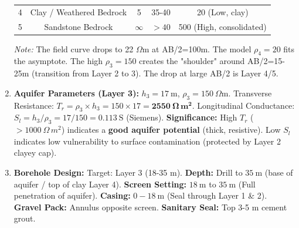 \documentclass[11pt]{article}
\begin{document}
\begin{exoresolu}
\begin{enumerate}
\begin{center}
\begin{tabular}{|c|c|c|c|c|}
    4 & Clay / Weathered Bedrock & 5 & 35-40 & 20 (Low, clay) \\
    5 & Sandstone Bedrock & $\infty$ & $>40$ & 500 (High, consolidated) \\
    \hline
    \end{tabular}
    \end{center}
    \textit{Note:} The field curve drops to 22 $\Omega$m at AB/2=100m. The model $\rho_4=20$ fits the asymptote. The high $\rho_3=150$ creates the "shoulder" around AB/2=15-25m (transition from Layer 2 to 3). The drop at large AB/2 is Layer 4/5.
    \item \textbf{Aquifer Parameters (Layer 3):}
    $h_3 = 17\ \mathrm{m}$, $\rho_3 = 150\ \Omega$m.
    Transverse Resistance: $T_r = \rho_3 \times h_3 = 150 \times 17 = \mathbf{2550\ \Omega\,m^2}$.
    Longitudinal Conductance: $S_l = h_3 / \rho_3 = 17 / 150 = \mathbf{0.113\ \mathrm{S}}$ (Siemens).
    \textbf{Significance:} High $T_r$ ($> 1000\ \Omega\,m^2$) indicates a \textbf{good aquifer potential} (thick, resistive). Low $S_l$ indicates low vulnerability to surface contamination (protected by Layer 2 clayey cap).
    \item \textbf{Borehole Design:}
    Target: Layer 3 (18-35 m).
    \textbf{Depth:} Drill to $35\ \mathrm{m}$ (base of aquifer / top of clay Layer 4).
    \textbf{Screen Setting:} $18\ \mathrm{m}$ to $35\ \mathrm{m}$ (Full penetration of aquifer).
    \textbf{Casing:} $0-18\ \mathrm{m}$ (Seal through Layer 1 \& 2).
    \textbf{Gravel Pack:} Annulus opposite screen.
    \textbf{Sanitary Seal:} Top 3-5 m cement grout.
\end{enumerate}
\end{exoresolu}
\end{document}
